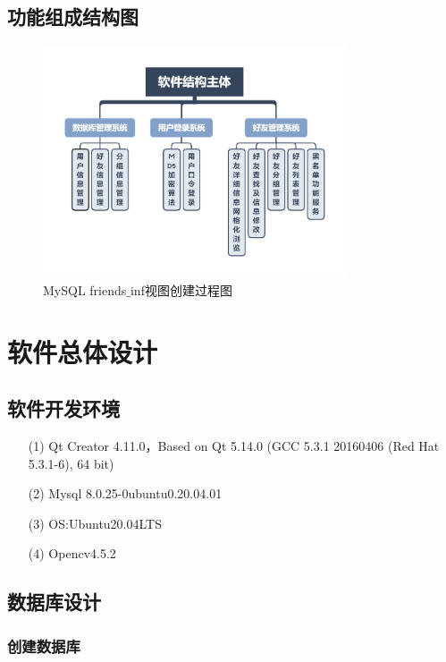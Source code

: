 \documentclass{progartcn}
\begin{document}
\subsection{功能组成结构图}

\begin{figure}[H]
	\centering
	\includegraphics[width=0.8\textwidth]{2.png}
	\caption{\centering  MySQL friends$ \_ $inf视图创建过程图}
\end{figure}

\section{软件总体设计}

\subsection{软件开发环境}
\begin{enumerate}[itemsep=0.01pt]
	\item[(1)]Qt Creator 4.11.0，Based on Qt 5.14.0 (GCC 5.3.1 20160406 (Red Hat 5.3.1-6), 64 bit)
\item[(2)]Mysql 8.0.25-0ubuntu0.20.04.01
\item[(3)]OS:Ubuntu20.04LTS
\item[(4)]Opencv4.5.2
\end{enumerate}

\subsection{数据库设计}

\subsubsection{创建数据库}
\end{document}
